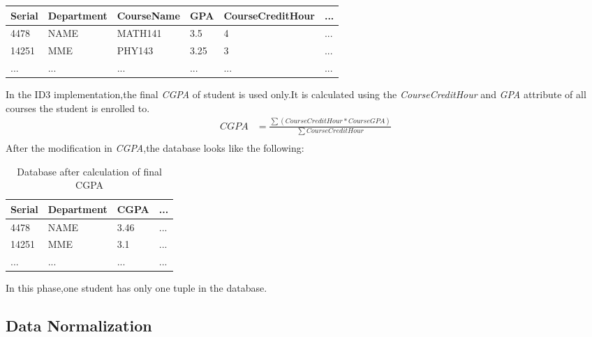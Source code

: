 \documentclass[a4paper,12pt]{book}
\begin{document}
\begin{itemize}
\begin {table}[H]
\begin{center}
\begin{tabular}{ | m{1cm} |  m{2cm} | m{2.1cm} | m{1cm} | m{3.1cm} | m{0.5cm} | } 
\hline
Serial & Department &  CourseName & GPA & CourseCreditHour & ... \\ 
\hline
4478 & NAME & MATH141 & 3.5 & 4 & ... \\ 
\hline
14251 & MME & PHY143 & 3.25 & 3 & ... \\ 
\hline
... & ... & ... & ... & ... & ... \\ 
\hline
\end{tabular}
\end{center}
\end{table}
In the ID3 implementation,the final \textit{CGPA} of student is used only.It is calculated using the 
\textit{CourseCreditHour} and \textit{GPA}  attribute of all courses the student is enrolled to.
 \begin{equation} \label{eq1}
\begin{split}
CGPA & = \frac{\sum (CourseCreditHour * CourseGPA)}{\sum CourseCreditHour} \\
\end{split}
\end{equation}
After the modification in \textit{CGPA},the database looks like the following:
\begin {table}[H]
\caption {Database after calculation of final CGPA} \label{tab:title}
\begin{center}
\begin{tabular}{ | m{1cm} |  m{2cm} | m{2cm} | m{2cm} | } 
\hline
Serial & Department & CGPA & ... \\ 
\hline
4478 & NAME & 3.46 & ... \\ 
\hline
14251 & MME & 3.1 & ... \\ 
\hline
... & ... & ... & ... \\ 
\hline
\end{tabular}

\end{center}

\end{table}
In this phase,one student has only one tuple in the database.
\end{itemize}

\subsection{Data Normalization}

\end{document}
